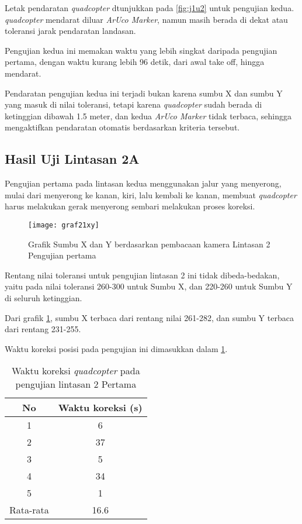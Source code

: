 Letak pendaratan \textit{quadcopter} dtunjukkan pada \cref{fig:j1u2} untuk pengujian kedua. \textit{quadcopter} mendarat diluar \textit{ArUco Marker}, namun masih berada di dekat atau toleransi jarak pendaratan landasan.

Pengujian kedua ini memakan waktu yang lebih singkat daripada pengujian pertama, dengan waktu kurang lebih 96 detik, dari awal take off, hingga mendarat.

Pendaratan pengujian kedua ini terjadi bukan karena sumbu X dan sumbu Y yang masuk di nilai toleransi, tetapi karena \textit{quadcopter} sudah berada di ketinggian dibawah 1.5 meter, dan kedua \textit{ArUco Marker} tidak terbaca, sehingga mengaktifkan pendaratan otomatis berdasarkan kriteria tersebut. 

\subsection{Hasil Uji Lintasan 2A}
Pengujian pertama pada lintasan kedua menggunakan jalur yang menyerong, mulai dari menyerong ke kanan, kiri, lalu kembali ke kanan, membuat \textit{quadcopter} harus melakukan gerak menyerong sembari melakukan proses koreksi.

\begin{figure}[H]
	\centering
	\texttt{[image: graf21xy]}
	\caption{Grafik Sumbu X dan Y berdasarkan pembacaan kamera Lintasan 2 Pengujian pertama}
	\label{fig:graf21xy}
\end{figure}

Rentang nilai toleransi untuk pengujian lintasan 2 ini tidak dibeda-bedakan, yaitu pada nilai toleransi 260-300 untuk Sumbu X, dan 220-260 untuk Sumbu Y di seluruh ketinggian.

Dari grafik \cref{fig:graf21xy}, sumbu X terbaca dari rentang nilai 261-282, dan sumbu Y terbaca dari rentang 231-255.  

Waktu koreksi posisi pada pengujian ini dimasukkan dalam \cref{tab:uji21}.

\begin{table}[H]
	\caption{Waktu koreksi \textit{quadcopter} pada pengujian lintasan 2 Pertama}
	\label{tab:uji21}
	\centering
	\begin{tabular}{@{}|c|c|@{}}
		\hline
		No        & Waktu koreksi (s) \\ \hline
		1         & 6                 \\ \hline
		2         & 37                \\ \hline
		3         & 5                 \\ \hline
		4         & 34                \\ \hline
		5         & 1                 \\ \hline
		Rata-rata & 16.6              \\ \hline
	\end{tabular}
\end{table}

